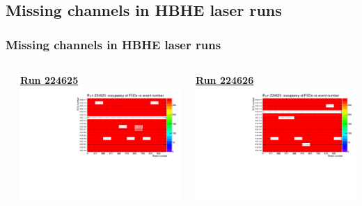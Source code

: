 \documentclass[bigger]{beamer}
\providecommand{\alert}[1]{\textbf{#1}}
\begin{document}
\subsection{Missing channels in HBHE laser runs}
\label{sec-1-2}
\begin{frame}
\frametitle{Missing channels in HBHE laser runs}
\label{sec-1-2-1}
\begin{columns} %
\label{sec-1-2-1-1}
\begin{column}{0.55\textwidth}
\label{sec-1-2-1-1-1}

\centering
\href{http://cmshcalweb01.cern.ch/DetDiag/Local_HTML/DQM_Hcal_R000224625_0/}{\alert{Run 224625}}
\includegraphics[width=.9\linewidth]{fig/fed_occ_vs_event_Run224625.pdf}
\end{column}
\begin{column}{0.55\textwidth}
\label{sec-1-2-1-1-2}

\centering
\href{http://cmshcalweb01.cern.ch/DetDiag/Local_HTML/DQM_Hcal_R000224625_0/}{\alert{Run 224626}}
\includegraphics[width=.9\linewidth]{fig/fed_occ_vs_event_Run224626.pdf}
\end{column}
\end{columns}
\begin{itemize}


\end{itemize}
\end{frame}
\end{document}
